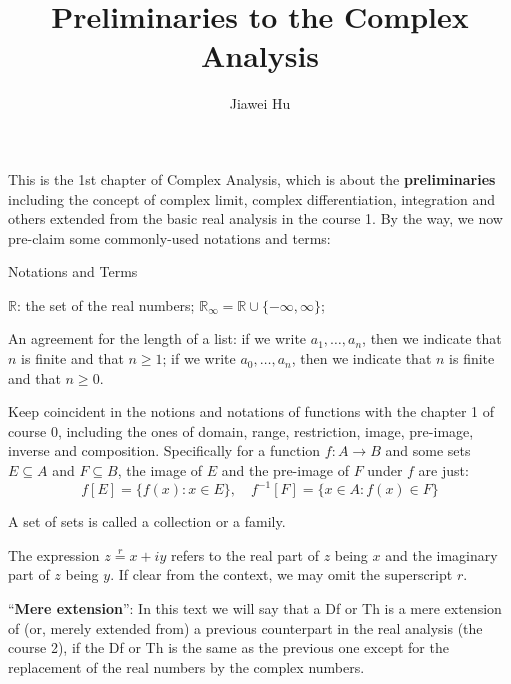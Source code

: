 \documentclass{article}
\title{\LARGE \textbf{Preliminaries to the Complex Analysis}}
\author{\large Jiawei Hu}
\begin{document}
\maketitle

This is the 1st chapter of Complex Analysis, which is about the \textbf{preliminaries} including the concept of complex limit, complex differentiation, integration and others extended from the basic real analysis in the course 1. By the way, we now pre-claim some commonly-used notations and terms:
\begin{Df}{Notations and Terms}
    \begin{compactenum}
        \item $\mathbb{R}$: the set of the real numbers; $\mathbb{R}_\infty = \mathbb{R}\cup\{-\infty, \infty\}$;
        \item An agreement for the length of a list: if we write $a_1, \dots, a_n$, then we indicate that $n$ is finite and that $n\geq 1$; if we write $a_0, \dots, a_n$, then we indicate that $n$ is finite and that $n\geq 0$.
        \item Keep coincident in the notions and notations of functions with the chapter 1 of course 0, including the ones of domain, range, restriction, image, pre-image, inverse and composition. Specifically for a function $f: A\rightarrow B$ and some sets $E\subseteq A$ and $F\subseteq B$, the image of $E$ and the pre-image of $F$ under $f$ are just:
        $$f[E] = \{f(x): x\in E\},\quad f^{-1}[F] = \{x\in A: f(x)\in F\}$$
        \item A set of sets is called a collection or a family.
        \item The expression $z\overset{r}{=}x+iy$ refers to the real part of $z$ being $x$ and the imaginary part of $z$ being $y$. If clear from the context, we may omit the superscript $r$.
        \item ``\textbf{Mere extension}'': In this text we will say that a Df or Th is a mere extension of (or, merely extended from) a previous counterpart in the real analysis (the course 2), if the Df or Th is the same as the previous one except for the replacement of the real numbers by the complex numbers.
    \end{compactenum}
\end{Df}
\end{document}
